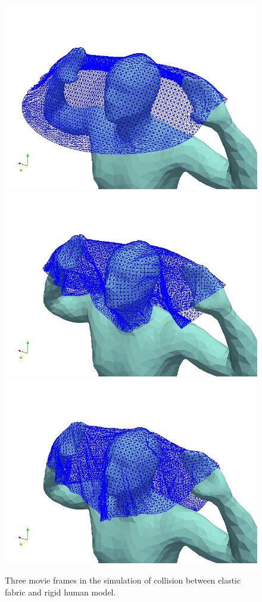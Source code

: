 \begin{figure}[!htbp]\centering
\includegraphics[width=0.3\columnwidth]{Figures/fabric-body-0.jpg}
\includegraphics[width=0.3\columnwidth]{Figures/fabric-body-1.jpg}
\includegraphics[width=0.3\columnwidth]{Figures/fabric-body-2.jpg}
\caption{Three movie frames in the simulation of collision between elastic fabric and rigid human model.}
\label{fig:collision_test_human}
\end{figure}

